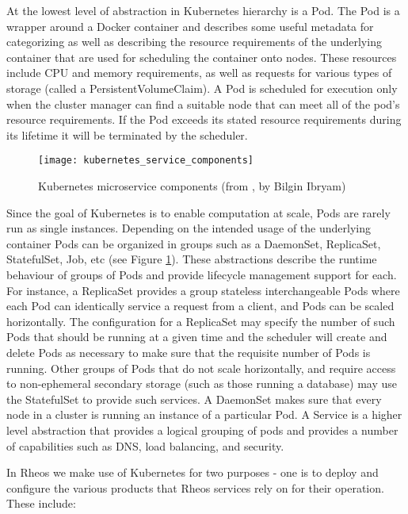 At the lowest level of abstraction in Kubernetes hierarchy is a Pod. The Pod is a wrapper around a Docker container and describes some useful metadata for categorizing as well as describing the resource requirements of the underlying container that are used for scheduling the container onto nodes. These resources include CPU and memory requirements, as well as requests for various types of storage (called a PersistentVolumeClaim). A Pod is scheduled for execution only when the cluster manager can find a suitable node that can meet all of the pod's resource requirements. If the Pod exceeds its stated resource requirements during its lifetime it will be terminated by the scheduler.

\begin{figure}[H]
    \texttt{[image: kubernetes\_service\_components]}
    \centering
    \caption {Kubernetes microservice components (from \autocite{kubernetes_microservice_components}, by Bilgin Ibryam)}
    \label{fig:kubernetes_service_components}
\end{figure}

Since the goal of Kubernetes is to enable computation at scale, Pods are rarely run as single instances. Depending on the intended usage of the underlying container Pods can be organized in groups such as a DaemonSet, ReplicaSet, StatefulSet, Job, etc (see Figure \ref{fig:kubernetes_service_components}). These abstractions describe the runtime behaviour of groups of Pods and provide lifecycle management support for each. For instance, a ReplicaSet provides a group stateless interchangeable Pods where each Pod can identically service a request from a client, and Pods can be scaled horizontally. The configuration for a ReplicaSet may specify the number of such Pods that should be running at a given time and the scheduler will create and delete Pods as necessary to make sure that the requisite number of Pods is running. Other groups of Pods that do not scale horizontally, and require access to non-ephemeral secondary storage (such as those running a database) may use the StatefulSet to provide such services. A DaemonSet makes sure that every node in a cluster is running an instance of a particular Pod. A Service is a higher level abstraction that provides a logical grouping of pods and provides a number of capabilities such as DNS, load balancing, and security.  

In Rheos we make use of Kubernetes for two purposes - one is to deploy and configure the various products that Rheos services rely on for their operation. These include:

